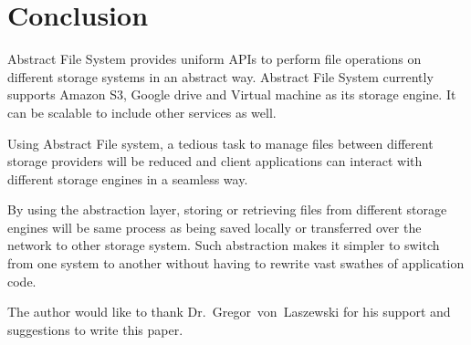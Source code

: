 \section{Conclusion}
Abstract File System provides uniform APIs to perform file operations on 
different storage systems in an abstract way. Abstract File System currently 
supports Amazon S3, Google drive and Virtual machine as its storage engine. It 
can be scalable to include other services as well. 


Using Abstract File system, a tedious task to manage files between different 
storage providers will be reduced and client applications can interact with 
different storage engines in a seamless way. 


By using the abstraction layer, storing or retrieving files from different 
storage engines will be same process as being saved locally or transferred 
over the network to other storage system. Such abstraction makes it simpler to 
switch from one system to another without having to rewrite vast swathes of 
application code.




\begin{acks}

  The author would like to thank Dr.~Gregor~von~Laszewski for his
  support and suggestions to write this paper.

\end{acks}


 

